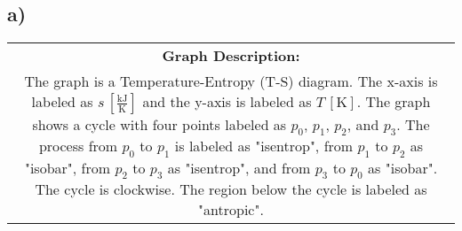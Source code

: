 

\subsection*{a)}

\begin{center}
\begin{tabular}{c}
\textbf{Graph Description:} \\
The graph is a Temperature-Entropy (T-S) diagram. The x-axis is labeled as $s \, [\frac{\text{kJ}}{\text{K}}]$ and the y-axis is labeled as $T \, [\text{K}]$. The graph shows a cycle with four points labeled as $p_0$, $p_1$, $p_2$, and $p_3$. The process from $p_0$ to $p_1$ is labeled as "isentrop", from $p_1$ to $p_2$ as "isobar", from $p_2$ to $p_3$ as "isentrop", and from $p_3$ to $p_0$ as "isobar". The cycle is clockwise. The region below the cycle is labeled as "antropic".
\end{tabular}
\end{center}
